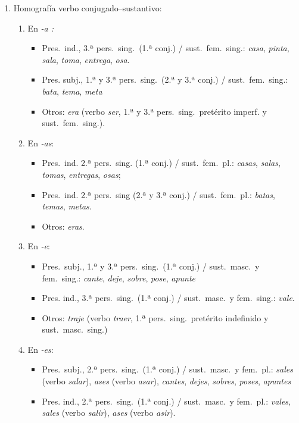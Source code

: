 \begin{enumerate} \item Homografía verbo conjugado--sustantivo: \begin{enumerate} 

\item En \emph{-a :} \begin{itemize} \item Pres.\ ind., 3.ª pers.\  sing.\ (1.ª conj.) / sust.\ fem.\ sing.: \emph{casa}, \emph{pinta}, \emph{ sala}, \emph{toma}, \emph{entrega}, \emph{osa}. \item Pres. subj., 1.ª y 3.ª pers.\ sing.\ (2.ª y 3.ª conj.) / sust.\ fem.\ sing.: \emph{bata}, \emph{tema}, \emph{meta} \item Otros: \emph{era} (verbo \emph{ser}, 1.ª y 3.ª pers.\ sing.\ pretérito imperf.  y sust.\ fem.\  sing.). \end{itemize} 

\item En \emph{-as}: \begin{itemize} \item Pres.\ ind. 2.ª pers.\ sing. (1.ª conj.) / sust.\ fem.\ pl.: \emph{casas}, \emph{salas}, \emph{tomas}, \emph{entregas}, \emph{osas}; \item Pres.\ ind. 2.ª pers.\ sing (2.ª y 3.ª conj.) / sust.\ fem.\ pl.: \emph{batas}, \emph{temas}, \emph{metas}. \item Otros: \emph{eras}. \end{itemize} 

\item En \emph{-e}: \begin{itemize} \item Pres.\ subj., 1.ª y 3.ª pers.\ sing.\ (1.ª conj.) / sust.\ masc.\  y fem.\ sing.: \emph{cante}, \emph{deje}, \emph{sobre}, \emph{pose}, \emph{apunte} \item Pres. ind., 3.ª pers.\ sing.\ (1.ª conj.) / sust.\ masc.\  y fem.\ sing.: \emph{vale}. \item Otros: \emph{traje} (verbo \emph{traer}, 1.ª pers.\ sing.\ pretérito indefinido y sust.\ masc.\ sing.) \end{itemize} 

\item En \emph{-es}: \begin{itemize} \item Pres.\ subj., 2.ª pers.\ sing.\ (1.ª conj.) / sust.\ masc.\  y fem.\ pl.: \emph{sales} (verbo \emph{salar}), \emph{ases} (verbo \emph{asar}), \emph{cantes}, \emph{dejes}, \emph{sobres}, \emph{poses}, \emph{apuntes} \item Pres. ind., 2.ª pers.\ sing.\ (1.ª conj.) / sust.\ masc.\  y fem.\ pl.: \emph{vales}, \emph{sales} (verbo \emph{salir}), \emph{ases} (verbo \emph{asir}). \end{itemize} 


\end{enumerate}
\end{enumerate}
